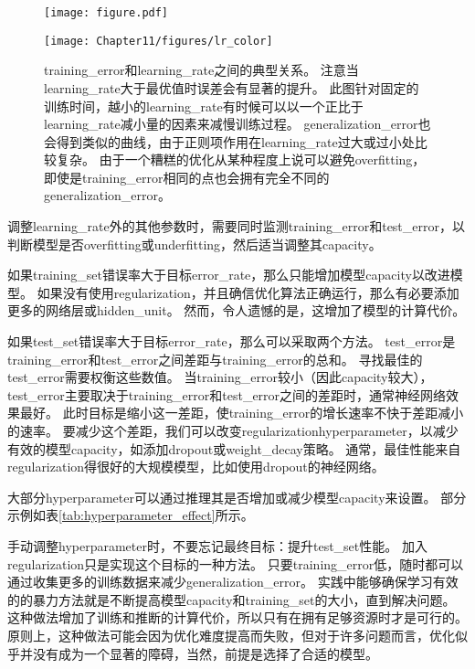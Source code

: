 \begin{figure}[!htb]
\ifOpenSource
\centerline{\texttt{[image: figure.pdf]}}
\else
\centerline{\texttt{[image: Chapter11/figures/lr\_color]}}
\fi
\caption{\gls{training_error}和\gls{learning_rate}之间的典型关系。
注意当\gls{learning_rate}大于最优值时误差会有显著的提升。
此图针对固定的训练时间，越小的\gls{learning_rate}有时候可以以一个正比于\gls{learning_rate}减小量的因素来减慢训练过程。
\gls{generalization_error}也会得到类似的曲线，由于正则项作用在\gls{learning_rate}过大或过小处比较复杂。
由于一个糟糕的优化从某种程度上说可以避免\gls{overfitting}，即使是\gls{training_error}相同的点也会拥有完全不同的\gls{generalization_error}。}
\label{fig:chap11_lr}
\end{figure}

调整\gls{learning_rate}外的其他参数时，需要同时监测\gls{training_error}和\gls{test_error}，以判断模型是否\gls{overfitting}或\gls{underfitting}，然后适当调整其\gls{capacity}。


如果\gls{training_set}错误率大于目标\gls{error_rate}，那么只能增加模型\gls{capacity}以改进模型。
如果没有使用\gls{regularization}，并且确信优化算法正确运行，那么有必要添加更多的网络层或\gls{hidden_unit}。
然而，令人遗憾的是，这增加了模型的计算代价。


如果\gls{test_set}错误率大于目标\gls{error_rate}，那么可以采取两个方法。
\gls{test_error}是\gls{training_error}和\gls{test_error}之间差距与\gls{training_error}的总和。
寻找最佳的\gls{test_error}需要权衡这些数值。
当\gls{training_error}较小（因此\gls{capacity}较大），\gls{test_error}主要取决于\gls{training_error}和\gls{test_error}之间的差距时，通常神经网络效果最好。
此时目标是缩小这一差距，使\gls{training_error}的增长速率不快于差距减小的速率。
要减少这个差距，我们可以改变\gls{regularization}\gls{hyperparameter}，以减少有效的模型\gls{capacity}，如添加\gls{dropout}或\gls{weight_decay}策略。
通常，最佳性能来自\gls{regularization}得很好的大规模模型，比如使用\gls{dropout}的神经网络。


大部分\gls{hyperparameter}可以通过推理其是否增加或减少模型\gls{capacity}来设置。
部分示例如表\ref{tab:hyperparameter_effect}所示。


手动调整\gls{hyperparameter}时，不要忘记最终目标：提升\gls{test_set}性能。
加入\gls{regularization}只是实现这个目标的一种方法。
只要\gls{training_error}低，随时都可以通过收集更多的训练数据来减少\gls{generalization_error}。
实践中能够确保学习有效的的暴力方法就是不断提高模型\gls{capacity}和\gls{training_set}的大小，直到解决问题。
这种做法增加了训练和推断的计算代价，所以只有在拥有足够资源时才是可行的。
原则上，这种做法可能会因为优化难度提高而失败，但对于许多问题而言，优化似乎并没有成为一个显著的障碍，当然，前提是选择了合适的模型。


